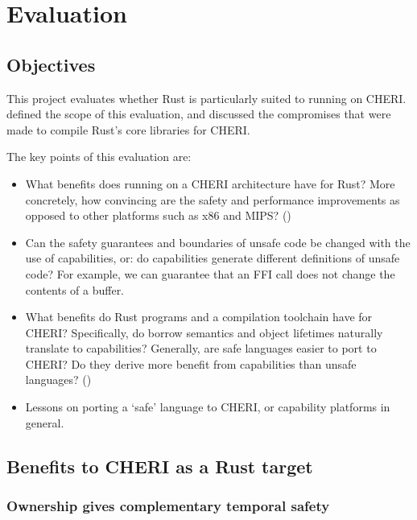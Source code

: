 \documentclass[dissertation.tex]{subfiles}
\begin{document}
\chapter{Evaluation}
\label{ch:eval}

\section{Objectives}
This project evaluates whether Rust is particularly suited to running on
CHERI.
 defined the scope of this evaluation, and
discussed the compromises that were made to compile Rust's core
libraries for CHERI.

The key points of this evaluation are:

\begin{itemize}
    \item What benefits does running on a CHERI architecture have for Rust?
    More concretely, how convincing are the safety and performance
    improvements as opposed to other platforms such as x86 and MIPS?
    ()
    \item Can the safety guarantees and boundaries of unsafe code be
    changed with the use of capabilities, or: do capabilities generate
    different definitions of unsafe code?
    For example, we can guarantee that an FFI call does not change the
    contents of a buffer.
    \item What benefits do Rust programs and a compilation toolchain
    have for CHERI?
    Specifically, do borrow semantics and object lifetimes naturally
    translate to capabilities?
    Generally, are safe languages easier to port to CHERI? Do they
    derive more benefit from capabilities than unsafe languages?
    ()
    \item Lessons on porting a `safe' language to CHERI, or capability
    platforms in general. 
\end{itemize}


\section{Benefits to CHERI as a Rust target}
\label{sec:eval-cheri}

\subsection{Ownership gives complementary temporal safety}
\label{sec:eval-cheri-spatial-temporal}
\end{document}
